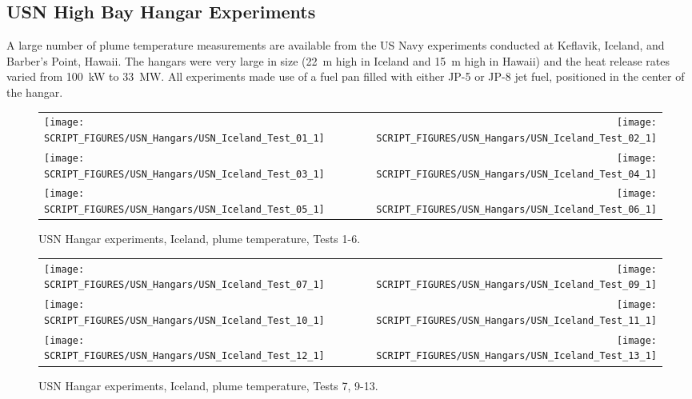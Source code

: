 \clearpage

\subsection{USN High Bay Hangar Experiments}

\label{USN_Plume}

A large number of plume temperature measurements are available from the US Navy experiments conducted at Keflavik, Iceland, and Barber's Point, Hawaii. The hangars were very large in size (22~m high in Iceland and 15~m high in Hawaii) and the heat release rates varied from 100~kW to 33~MW. All experiments made use of a fuel pan filled with either JP-5 or JP-8 jet fuel, positioned in the center of the hangar.


\begin{figure}[h!]
\begin{tabular*}{\textwidth}{l@{\extracolsep{\fill}}r}
\texttt{[image: SCRIPT\_FIGURES/USN\_Hangars/USN\_Iceland\_Test\_01\_1]} &
\texttt{[image: SCRIPT\_FIGURES/USN\_Hangars/USN\_Iceland\_Test\_02\_1]} \\
\texttt{[image: SCRIPT\_FIGURES/USN\_Hangars/USN\_Iceland\_Test\_03\_1]} &
\texttt{[image: SCRIPT\_FIGURES/USN\_Hangars/USN\_Iceland\_Test\_04\_1]} \\
\texttt{[image: SCRIPT\_FIGURES/USN\_Hangars/USN\_Iceland\_Test\_05\_1]} &
\texttt{[image: SCRIPT\_FIGURES/USN\_Hangars/USN\_Iceland\_Test\_06\_1]} \\
\end{tabular*}
\caption[USN Hangar experiments, Iceland, plume temperature, Tests 1-6]
{USN Hangar experiments, Iceland, plume temperature, Tests 1-6.}
\label{USN_Plume_Iceland_1}
\end{figure}

\newpage

\begin{figure}[p]
\begin{tabular*}{\textwidth}{l@{\extracolsep{\fill}}r}
\texttt{[image: SCRIPT\_FIGURES/USN\_Hangars/USN\_Iceland\_Test\_07\_1]} &
\texttt{[image: SCRIPT\_FIGURES/USN\_Hangars/USN\_Iceland\_Test\_09\_1]} \\
\texttt{[image: SCRIPT\_FIGURES/USN\_Hangars/USN\_Iceland\_Test\_10\_1]} &
\texttt{[image: SCRIPT\_FIGURES/USN\_Hangars/USN\_Iceland\_Test\_11\_1]} \\
\texttt{[image: SCRIPT\_FIGURES/USN\_Hangars/USN\_Iceland\_Test\_12\_1]} &
\texttt{[image: SCRIPT\_FIGURES/USN\_Hangars/USN\_Iceland\_Test\_13\_1]} \\
\end{tabular*}
\caption[USN Hangar experiments, Iceland, plume temperature, Tests 7, 9-13]
{USN Hangar experiments, Iceland, plume temperature, Tests 7, 9-13.}
\label{USN_Plume_Iceland_2}
\end{figure}

